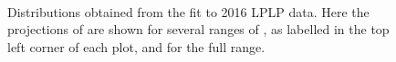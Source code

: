 \begin{figure}[h!]
\\
\caption{Distributions obtained from the fit to 2016 LPLP data. Here the projections of \MJO are shown for several ranges of \MVV, as labelled in the top left corner of each plot, and for the full \MJT range.}
\label{fig:postfitLPLP_X}
\end{figure}
